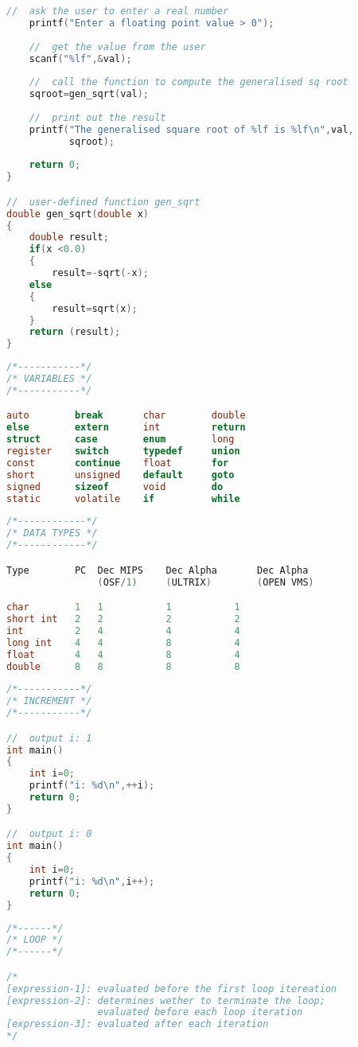 \documentclass[8pt]{extarticle}
\begin{document}
\begin{small}
\begin{multicols}{2}
\begin{lstlisting}[language=C]
    //  ask the user to enter a real number   
	printf("Enter a floating point value > 0");
	
    //  get the value from the user
	scanf("%lf",&val);
	
    //  call the function to compute the generalised sq root
    sqroot=gen_sqrt(val);
    
    //  print out the result
    printf("The generalised square root of %lf is %lf\n",val,
    	   sqroot);
    
    return 0;
}

//  user-defined function gen_sqrt
double gen_sqrt(double x)
{
	double result;
	if(x <0.0)
	{
        result=-sqrt(-x);
	else
	{
		result=sqrt(x);
	}
	return (result);
}
\end{lstlisting}

\begin{lstlisting}[language=C]
/*-----------*/
/* VARIABLES */
/*-----------*/

auto		break		char		double
else		extern		int			return
struct		case		enum		long
register	switch		typedef		union
const		continue	float		for
short		unsigned	default		goto
signed		sizeof		void		do
static		volatile	if			while
\end{lstlisting}

\begin{lstlisting}[language=C]
/*------------*/
/* DATA TYPES */
/*------------*/

Type		PC	Dec MIPS	Dec Alpha		Dec Alpha 
				(OSF/1)		(ULTRIX)		(OPEN VMS)

char		1	1			1			1
short int	2	2			2			2
int			2	4			4			4
long int	4	4			8			4
float		4	4			8			4
double		8	8			8			8
\end{lstlisting}

\begin{lstlisting}[language=C]
/*-----------*/
/* INCREMENT */
/*-----------*/

//  output i: 1
int main()
{
	int i=0;
	printf("i: %d\n",++i);
	return 0;
}

//  output i: 0
int main()
{
	int i=0;
	printf("i: %d\n",i++);
	return 0;
}
\end{lstlisting}

\begin{lstlisting}[language=C]
/*------*/
/* LOOP */
/*------*/

/*
[expression-1]: evaluated before the first loop itereation
[expression-2]: determines wether to terminate the loop; 
				evaluated before each loop iteration
[expression-3]: evaluated after each iteration
*/


\end{lstlisting}
\end{multicols}
\end{small}
\end{document}
